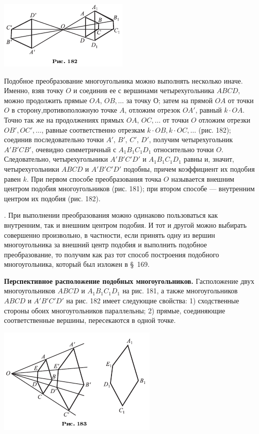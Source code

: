 \documentclass[oneside]{book}
\begin{document}
\includegraphics{pics/ris-182}

Подобное преобразование многоугольника можно выполнять несколько иначе.
Именно, взяв точку $O$ и соединив ее с вершинами четырехугольника $ABCD$, можно продолжить прямые $OA$, $OB,\dots$
за точку О;
затем на прямой $OA$ от точки $O$ в сторону,противоположную точке $A$, отложим отрезок $OA'$, равный $k\cdot OA$.
Точно так же на продолжениях прямых $OA$, $OC,\dots$
от точки $O$ отложим отрезки $OB', OC',\dots$, равные соответственно отрезкам $k\cdot OB, k\cdot OC,\dots$
(рис. 182);
соединив последовательно точки $A'$, $B'$, $C'$, $D'$, получим четырехугольник $A'B'CB'$, очевидно симметричный с $A_1B_1C_1D_1$ относительно точки $O$.
Следовательно, четырехугольники $A'B'C'D'$ и $A_1B_1C_1D_1$ равны и, значит, четырехугольники $ABCD$ и $A'B'C'D'$ подобны, причем коэффициент их подобия равен $k$.
При первом способе преобразования точка $O$ называется внешним центром подобия многоугольников (рис. 181);
при втором способе — внутренним центром их подобия (рис. 182).

.
При выполнении преобразования можно одинаково пользоваться как внутренним, так и внешним центром подобия.
И тот и другой можно выбирать совершенно произвольно, в частности, если принять одну из вершин многоугольника за внешний центр подобия и выполнить подобное преобразование, то получим как раз тот способ построения подобного многоугольника, который был изложен в §~169.

\textbf{Перспективное расположение подобных многоугольников.}
Гасположение двух многоугольников $ABCD$ и $A_1B_1C_1D_1$ на рис. 181, а также многоугольников $ABCD$ и $A'B'C'D'$ на рис. 182 имеет следующие свойства:
1) сходственные стороны обоих многоугольников параллельны;
2) прямые, соединяющие соответственные вершины, пересекаются в одной точке.

\includegraphics{pics/ris-183}
\end{document}

